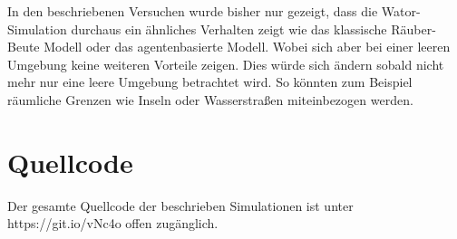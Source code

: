 \documentclass[a4paper,twoside]{article}
\begin{document}
	In den beschriebenen Versuchen wurde bisher nur gezeigt, dass die Wator-Simulation durchaus ein ähnliches Verhalten zeigt wie das klassische Räuber-Beute Modell oder das agentenbasierte Modell. Wobei sich aber bei einer leeren Umgebung keine weiteren Vorteile zeigen. Dies würde sich ändern sobald nicht mehr nur eine leere Umgebung betrachtet wird. So könnten zum Beispiel räumliche Grenzen wie Inseln oder Wasserstraßen miteinbezogen werden.
	
	\newpage
	
	\vfill
	
	{\small
	}
	
	\section*{Quellcode}
	Der gesamte Quellcode der beschrieben Simulationen ist unter https://git.io/vNc4o offen zugänglich.
\end{document}
